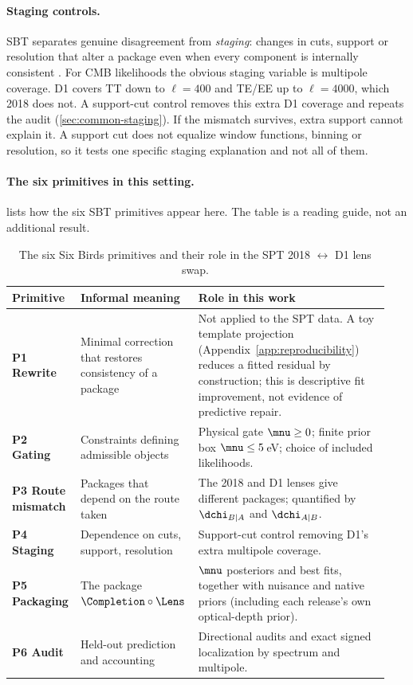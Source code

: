 \paragraph{Staging controls.}
SBT separates genuine disagreement from \emph{staging}: changes in cuts, support or resolution that alter a package even when every component is internally consistent \cite{sixbirds_foundations}. For CMB likelihoods the obvious staging variable is multipole coverage. D1 covers TT down to $\ell=400$ and TE/EE up to $\ell=4000$, which 2018 does not. A support-cut control removes this extra D1 coverage and repeats the audit (\cref{sec:common-staging}). If the mismatch survives, extra support cannot explain it. A support cut does not equalize window functions, binning or resolution, so it tests one specific staging explanation and not all of them.

\paragraph{The six primitives in this setting.}
 lists how the six SBT primitives appear here. The table is a reading guide, not an additional result.

\begin{table}[t]
  \centering
  \caption{The six Six Birds primitives and their role in the SPT 2018 $\leftrightarrow$ D1 lens swap.}
  \label{tab:sixbirds_primitives}
  \setlength{\tabcolsep}{4pt}
  \renewcommand{\arraystretch}{1.08}
  \small
  \begin{tabular}{@{}>{\raggedright\arraybackslash}p{0.17\linewidth} >{\raggedright\arraybackslash}p{0.27\linewidth} >{\raggedright\arraybackslash}p{0.50\linewidth}@{}}
    \toprule
    Primitive & Informal meaning & Role in this work \\
    \midrule
    \textbf{P1 Rewrite} & Minimal correction that restores consistency of a package &
    Not applied to the SPT data. A toy template projection (Appendix~\ref{app:reproducibility}) reduces a fitted residual by construction; this is descriptive fit improvement, not evidence of predictive repair. \\
    \textbf{P2 Gating} & Constraints defining admissible objects &
    Physical gate $\mnu\ge0$; finite prior box $\mnu\le5$\,eV; choice of included likelihoods. \\
    \textbf{P3 Route mismatch} & Packages that depend on the route taken &
    The 2018 and D1 lenses give different packages; quantified by $\dchi_{B|A}$ and $\dchi_{A|B}$. \\
    \textbf{P4 Staging} & Dependence on cuts, support, resolution &
    Support-cut control removing D1's extra multipole coverage. \\
    \textbf{P5 Packaging} & The package $\Completion\circ\Lens$ &
    $\mnu$ posteriors and best fits, together with nuisance and native priors (including each release's own optical-depth prior). \\
    \textbf{P6 Audit} & Held-out prediction and accounting &
    Directional audits and exact signed localization by spectrum and multipole. \\
    \bottomrule
  \end{tabular}
\end{table}
